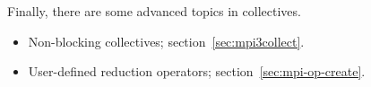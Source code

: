 Finally, there are some advanced topics in collectives.
\begin{itemize}
\item Non-blocking collectives; section~\ref{sec:mpi3collect}.
\item User-defined reduction operators; section~\ref{sec:mpi-op-create}.
\end{itemize}














